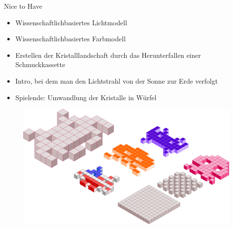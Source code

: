 \slideonetoone
{Nice to Have}
{
	\begin{itemize}
		\item Wissenschaftlichbasiertes Lichtmodell 
		\item Wissenschaftlichbasiertes Farbmodell
		\item Erstellen der Kristalllandschaft durch das Herunterfallen einer Schmuckkassette
		\item Intro, bei dem man den Lichtstrahl von der Sonne zur Erde verfolgt
		\item Spielende: Umwandlung der Kristalle in Würfel
	\end{itemize}
}
{
	\begin{figure}
		\centering
		\includegraphics[width=\textwidth, height=0.7\textheight, keepaspectratio]{images/space-invaders-151432}
	\end{figure}
}

%

